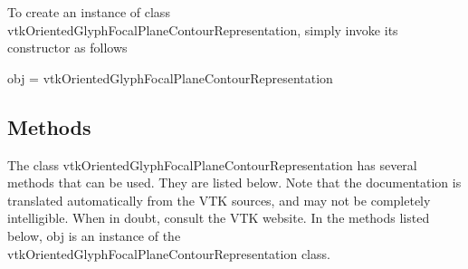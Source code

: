 To create an instance of class vtk\-Oriented\-Glyph\-Focal\-Plane\-Contour\-Representation, simply invoke its constructor as follows \begin{DoxyVerb}  obj = vtkOrientedGlyphFocalPlaneContourRepresentation
\end{DoxyVerb}
 \hypertarget{vtkwidgets_vtkxyplotwidget_Methods}{}\subsection{Methods}\label{vtkwidgets_vtkxyplotwidget_Methods}
The class vtk\-Oriented\-Glyph\-Focal\-Plane\-Contour\-Representation has several methods that can be used. They are listed below. Note that the documentation is translated automatically from the V\-T\-K sources, and may not be completely intelligible. When in doubt, consult the V\-T\-K website. In the methods listed below, {\ttfamily obj} is an instance of the vtk\-Oriented\-Glyph\-Focal\-Plane\-Contour\-Representation class. 

